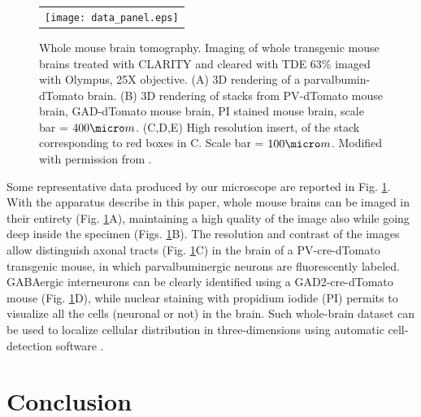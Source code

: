 \documentclass[12pt]{spieman}  %
\begin{document}
	\begin{figure}
   \begin{center}
   \begin{tabular}{c}
   \texttt{[image: data\_panel.eps]}
   \end{tabular}
   \end{center}
   \caption{\label{fig:LSMdata} Whole mouse brain tomography. Imaging of whole transgenic mouse brains treated with CLARITY and cleared with TDE 63\% imaged with Olympus, 25X objective. (A) 3D rendering of a parvalbumin-dTomato brain. (B) 3D rendering of stacks from PV-dTomato mouse brain, GAD-dTomato mouse brain,  PI stained mouse brain, scale bar = $400 \micro m$. (C,D,E) High resolution insert, of the stack corresponding to red boxes in C. Scale bar = $100 \micro m$. Modified with permission from \cite{Costantini}.} 
   \end{figure}
	
Some representative data produced by our microscope are reported in Fig. \ref{fig:LSMdata}. With the apparatus describe in this paper, whole mouse brains can be imaged in their entirety (Fig. \ref{fig:LSMdata}A), maintaining a high quality of the image also while going deep inside the specimen (Figs. \ref{fig:LSMdata}B). The resolution and contrast of the images allow distinguish axonal tracts (Fig. \ref{fig:LSMdata}C) in the brain of a PV-cre-dTomato transgenic mouse, in which parvalbuminergic neurons are fluorescently labeled. GABAergic interneurons can be clearly identified using a GAD2-cre-dTomato mouse (Fig. \ref{fig:LSMdata}D), while nuclear staining with propidium iodide (PI) permits to visualize all the cells (neuronal or not) in the brain. Such whole-brain dataset can be used to localize cellular distribution in three-dimensions using automatic cell-detection software \cite{Frasconi2014}.

\section{Conclusion}
\end{document}
